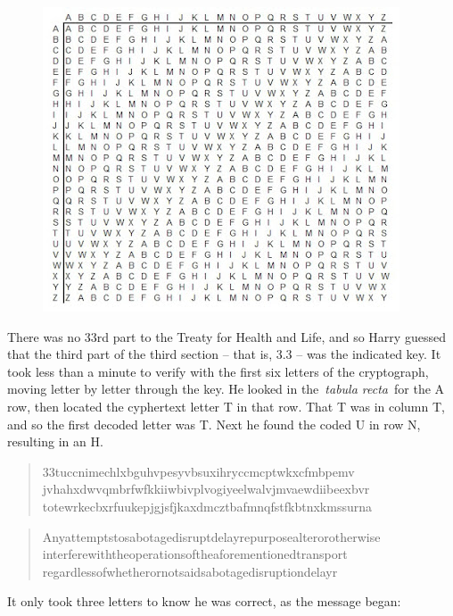 \begin{figure}
\centering
\includegraphics[width=\textwidth]{Aspose.Words.d1453338-0fe6-41b2-89c3-946dd7843261.001.jpeg}
\end{figure}

There was no 33rd part to the Treaty for Health and Life, and so Harry
guessed that the third part of the third section -- that is, 3.3 -- was
the indicated key. It took less than a minute to verify with the first
six letters of the cryptograph, moving letter by letter through the key.
He looked in the~\emph{tabula recta}~for the A row, then located the
cyphertext letter T in that row. That T was in column T, and so the
first decoded letter was T. Next he found the coded U in row N,
resulting in an H.\\

\begin{quote}
\noindent 33tuccnimechlxbguhvpesyvbsuxihryccmcptwkxcfmbpemv
jvhahxdwvqmbrfwfkkiiwbivplvogiyeelwalvjmvaewdiibeexbvr
totewrkecbxrfuukepjgjsfjkaxdmcztbafmnqfstfkbtnxkmssurna
\end{quote}

\begin{quote}
\noindent Anyattemptstosabotagedisruptdelayrepurposealterorotherwise
interferewiththeoperationsoftheaforementionedtransport
regardlessofwhetherornotsaidsabotagedisruptiondelayr\\
\end{quote}

It only took three letters to know he was correct, as the message
began:\\

